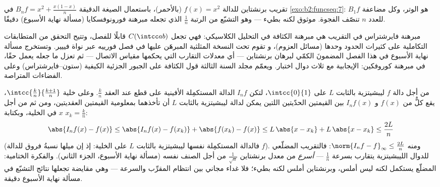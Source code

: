 \begin{omfigure}

{\small تقريب برنشتاين للدالة $f(x) = x^2$ (بالأحمر)، باستعمال
الصيغة الدقيقة $B_nf = x^2 + \frac{x(1-x)}{n}$ في
\cref{exo:b2:funcseq:7}: $B_1f$ هو الوتر، وكل مضاعفة
للعدد $n$ تنصّف الفجوة. موثوق لكنه بطيء --- وهو التشبّع من الرتبة
$\frac1n$ الذي تجعله مبرهنة فورونوفسكايا (مسألة نهاية الأسبوع)
دقيقًا.}
\end{omfigure}

\begin{remark}
مبرهنة فايرشتراس في التقريب هي مبرهنة الكثافة في التحليل
الكلاسيكي: فهي تجعل $C(\intcc ab)$ قابلًا للفصل، وتتيح التحقق من
المتطابقات التكاملية على كثيرات الحدود وحدها (مسائل العزوم)، و
تقوم تحت النسخة المثلثية المبرهَن عليها في فصل فورييه
عبر نواة فييير. وتستخرج مسألة نهاية الأسبوع في هذا الفصل
المضمونَ الكمّي لبرهان برنشتاين
--- أي معدلات التقارب التي يحكمها مقياس الاتصال ---
ثم تعزل ما جعله يعمل حقًا، في مبرهنة كوروفكين:
الإيجابية مع ثلاث دوال اختبار. ويعمّم مجلد السنة
الثالثة قول الكثافة على الجبور الجزئية الكيفية
(ستون--فايرشتراس) وعلى الفضاءات المتراصة.
\end{remark}

\begin{example}\label{ex:b2:funcseq:polygonal}
من أجل دالة $f$ ليبشيتزية بالثابت $L$ على $\intcc{0}{1}$، لتكن $I_nf$
الدالة المستكمِلة الأفينية على قطع عند العقد $\frac kn$. وعلى
خلية $\intcc{\frac kn}{\frac{k+1}n}$، يقع كلٌّ من $f(x)$ و
$I_nf(x)$ بين القيمتين الحدّيتين اللتين يمكن لدالة ليبشيتزية بالثابت $L$
أن تأخذهما بمعلومية القيمتين العقديتين، ومن ثم من أجل $x$ في
الخلية، وبكتابة $x_k = \frac kn$:
\[
\abs{I_nf(x) - f(x)}
\leq \abs{I_nf(x) - f(x_k)} + \abs{f(x_k) - f(x)}
\leq L\,\abs{x - x_k} + L\,\abs{x - x_k}
\leq \frac{2L}{n}
\]
(فالدالة المستكمِلة نفسها ليبشيتزية بالثابت $L$ على الخلية: إذ إن
ميلها نسبةُ فروق للدالة $f$). ومنه $\norm{I_nf -
f}_\infty \leq \frac{2L}{n}$: فالتقريب المضلّعي للدوال
الليبشيتزية يتقارب بسرعة $\frac1n$ ---
\emph{أسرع} من معدل برنشتاين $\frac{1}{\sqrt n}$ من أجل
الصنف نفسه (مسألة نهاية الأسبوع، الجزء الثاني). والفكرة الختامية:
المضلّع يستكمل لكنه ليس أملس، وبرنشتاين أملس
لكنه بطيء؛ فلا غداء مجاني بين انتظام
المقرِّب والسرعة --- وهي مقايضة تجعلها نتائج التشبّع
في مسألة نهاية الأسبوع دقيقة.
\end{example}

